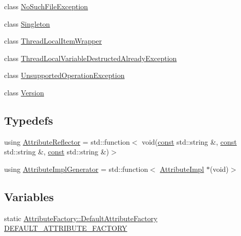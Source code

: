 \begin{DoxyCompactItemize}
class \mbox{\hyperlink{classlucene_1_1core_1_1util_1_1NoSuchFileException}{No\+Such\+File\+Exception}}
\item 
class \mbox{\hyperlink{classlucene_1_1core_1_1util_1_1Singleton}{Singleton}}
\item 
class \mbox{\hyperlink{classlucene_1_1core_1_1util_1_1ThreadLocalItemWrapper}{Thread\+Local\+Item\+Wrapper}}
\item 
class \mbox{\hyperlink{classlucene_1_1core_1_1util_1_1ThreadLocalVariableDestructedAlreadyException}{Thread\+Local\+Variable\+Destructed\+Already\+Exception}}
\item 
class \mbox{\hyperlink{classlucene_1_1core_1_1util_1_1UnsupportedOperationException}{Unsupported\+Operation\+Exception}}
\item 
class \mbox{\hyperlink{classlucene_1_1core_1_1util_1_1Version}{Version}}
\end{DoxyCompactItemize}
\subsection*{Typedefs}
\begin{DoxyCompactItemize}
\item 
using \mbox{\hyperlink{namespacelucene_1_1core_1_1util_a7dbb701adaed055f73fb95eec83da10a}{Attribute\+Reflector}} = std\+::function$<$ void(\mbox{\hyperlink{ZlibCrc32_8h_a2c212835823e3c54a8ab6d95c652660e}{const}} std\+::string \&, \mbox{\hyperlink{ZlibCrc32_8h_a2c212835823e3c54a8ab6d95c652660e}{const}} std\+::string \&, \mbox{\hyperlink{ZlibCrc32_8h_a2c212835823e3c54a8ab6d95c652660e}{const}} std\+::string \&)$>$
\item 
using \mbox{\hyperlink{namespacelucene_1_1core_1_1util_acbd8821be7d7b29749374e57b0a7c40b}{Attribute\+Impl\+Generator}} = std\+::function$<$ \mbox{\hyperlink{classlucene_1_1core_1_1util_1_1AttributeImpl}{Attribute\+Impl}} $\ast$(void)$>$
\end{DoxyCompactItemize}
\subsection*{Variables}
\begin{DoxyCompactItemize}
\item 
static \mbox{\hyperlink{classlucene_1_1core_1_1util_1_1AttributeFactory_1_1DefaultAttributeFactory}{Attribute\+Factory\+::\+Default\+Attribute\+Factory}} \mbox{\hyperlink{namespacelucene_1_1core_1_1util_aff58249bc13b07b9fde5d2bce9afa79e}{D\+E\+F\+A\+U\+L\+T\+\_\+\+A\+T\+T\+R\+I\+B\+U\+T\+E\+\_\+\+F\+A\+C\+T\+O\+RY}}
\end{DoxyCompactItemize}


